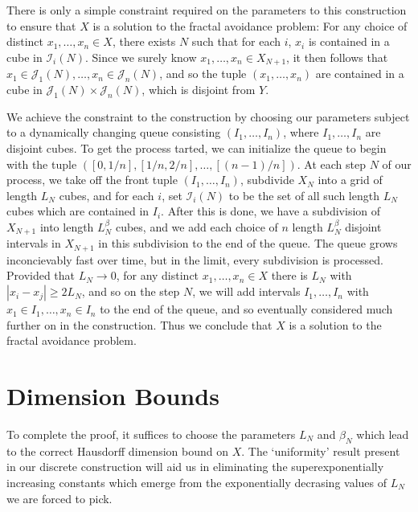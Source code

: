 \documentclass{article}
\theoremstyle{plain}
\theoremstyle{plain}
\begin{document}
\begin{multicols}{2}
There is only a simple constraint required on the parameters to this construction to ensure that $X$ is a solution to the fractal avoidance problem: For any choice of distinct $x_1, \dots, x_n \in X$, there exists $N$ such that for each $i$, $x_i$ is contained in a cube in $\mathcal{I}_i(N)$. Since we surely know $x_1, \dots, x_n \in X_{N+1}$, it then follows that $x_1 \in \mathcal{J}_1(N), \dots, x_n \in \mathcal{J}_n(N)$, and so the tuple $(x_1, \dots, x_n)$ are contained in a cube in $\mathcal{J}_1(N) \times \mathcal{J}_n(N)$, which is disjoint from $Y$.


We achieve  the constraint to the construction by choosing our parameters subject to a dynamically changing queue consisting $(I_1, \dots, I_n)$, where $I_1 ,\dots, I_n$ are disjoint cubes. To get the process tarted, we can initialize the queue to begin with the tuple $([0,1/n], [1/n,2/n], \dots, [(n-1)/n])$. At each step $N$ of our process, we take off the front tuple $(I_1, \dots, I_n)$, subdivide $X_N$ into a grid of length $L_N$ cubes, and for each $i$, set $\mathcal{I}_i(N)$ to be the set of all such length $L_N$ cubes which are contained in $I_i$. After this is done, we have a subdivision of $X_{N+1}$ into length $L_N^\beta$ cubes, and we add each choice of $n$ length $L_N^\beta$ disjoint intervals in $X_{N+1}$ in this subdivision to the end of the queue. The queue grows inconcievably fast over time, but in the limit, every subdivision is processed. Provided that $L_N \to 0$, for any distinct $x_1, \dots, x_n \in X$ there is $L_N$ with $|x_i - x_j| \geq 2 L_N$, and so on the step $N$, we will add intervals $I_1, \dots, I_n$ with $x_1 \in I_1, \dots, x_n \in I_n$ to the end of the queue, and so eventually considered much further on in the construction. Thus we conclude that $X$ is a solution to the fractal avoidance problem.

\section{Dimension Bounds}

To complete the proof, it suffices to choose the parameters $L_N$ and $\beta_N$ which lead to the correct Hausdorff dimension bound on $X$. The `uniformity' result present in our discrete construction will aid us in eliminating the superexponentially increasing constants which emerge from the exponentially decrasing values of $L_N$ we are forced to pick.


\end{multicols}
\end{document}
